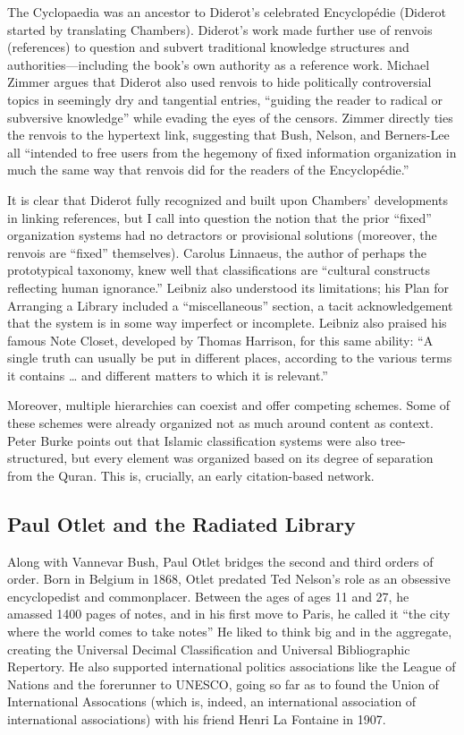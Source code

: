 The Cyclopaedia was an ancestor to Diderot’s celebrated Encyclopédie (Diderot started by translating Chambers). Diderot’s work made further use of renvois (references) to question and subvert traditional knowledge structures and authorities—including the book’s own authority as a reference work. Michael Zimmer argues that Diderot also used renvois to hide politically controversial topics in seemingly dry and tangential entries, “guiding the reader to radical or subversive knowledge” while evading the eyes of the censors.  Zimmer directly ties the renvois to the hypertext link, suggesting that Bush, Nelson, and Berners-Lee all “intended to free users from the hegemony of fixed information organization in much the same way that renvois did for the readers of the Encyclopédie.” 

It is clear that Diderot fully recognized and built upon Chambers’ developments in linking references, but I call into question the notion that the prior “fixed” organization systems had no detractors or provisional solutions (moreover, the renvois are “fixed” themselves). Carolus Linnaeus, the author of perhaps the prototypical taxonomy, knew well that classifications are “cultural constructs reflecting human ignorance.”  Leibniz also understood its limitations; his Plan for Arranging a Library included a “miscellaneous” section, a tacit acknowledgement that the system is in some way imperfect or incomplete. Leibniz also praised his famous Note Closet, developed by Thomas Harrison, for this same ability: “A single truth can usually be put in different places, according to the various terms it contains … and different matters to which it is relevant.” 

Moreover, multiple hierarchies can coexist and offer competing schemes. Some of these schemes were already organized not as much around content as context. Peter Burke points out that Islamic classification systems were also tree-structured, but every element was organized based on its degree of separation from the Quran.  This is, crucially, an early citation-based network.

\subsection{Paul Otlet and the Radiated Library}

Along with Vannevar Bush, Paul Otlet bridges the second and third orders of order. Born in Belgium in 1868, Otlet predated Ted Nelson’s role as an obsessive encyclopedist and commonplacer. Between the ages of ages 11 and 27, he amassed 1400 pages of notes, and in his first move to Paris, he called it “the city where the world comes to take notes”  He liked to think big and in the aggregate, creating the Universal Decimal Classification and Universal Bibliographic Repertory. He also supported international politics associations like the League of Nations and the forerunner to UNESCO, going so far as to found the Union of International Assocations (which is, indeed, an international association of international associations) with his friend Henri La Fontaine in 1907.

